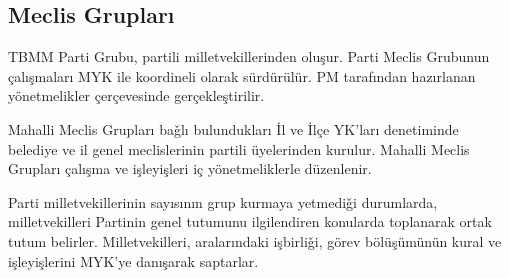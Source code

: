 \documentclass[11pt]{article} %
\begin{document}
\subsection{Meclis Grupları}
TBMM Parti Grubu, partili milletvekillerinden oluşur. Parti Meclis Grubunun çalışmaları MYK ile koordineli olarak sürdürülür. PM tarafından hazırlanan yönetmelikler çerçevesinde gerçekleştirilir.

Mahalli Meclis Grupları baǧlı bulundukları İl ve İlçe YK’ları denetiminde belediye ve il genel meclislerinin partili üyelerinden kurulur. Mahalli Meclis Grupları çalışma ve işleyişleri iç yönetmeliklerle düzenlenir.

Parti milletvekillerinin sayısının grup kurmaya yetmediǧi durumlarda, milletvekilleri Partinin genel tutumunu ilgilendiren konularda toplanarak ortak tutum belirler. Milletvekilleri, aralarındaki işbirliǧi, görev bölüşümünün kural ve işleyişlerini MYK’ye danışarak saptarlar.
\end{document}
